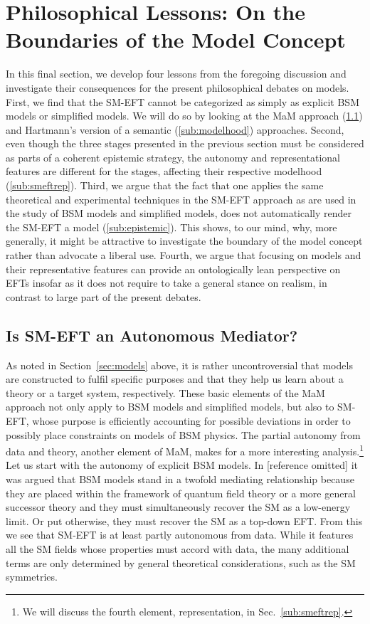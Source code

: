 \section{Philosophical Lessons: On the Boundaries of the Model Concept}	%
\label{sec:analysis}


In this final section, we develop four lessons from the foregoing discussion and investigate their consequences for the present philosophical debates on models. First, we find that the SM-EFT cannot be categorized as simply as explicit BSM models or simplified models. We will do so by looking at the MaM approach (\ref{sub:autonomy}) and Hartmann's version of a semantic (\ref{sub:modelhood}) approaches. Second, even though the three stages presented in the previous section must be considered as parts of a coherent epistemic strategy, the autonomy and representational features are different for the stages, affecting their respective modelhood (\ref{sub:smeftrep}).
Third, we argue that the fact that one applies the same theoretical and experimental techniques in the SM-EFT approach as are used in the study of BSM models and simplified models, does not automatically render the SM-EFT a model (\ref{sub:epistemic}). 
This shows, to our mind, why, more generally, it might be attractive to investigate the boundary of the model concept rather than advocate a liberal use. 
Fourth, we argue that focusing on models and their representative features can provide an ontologically lean perspective on EFTs insofar as it does not require to take a general stance on realism, in contrast to large part of the present debates.


\subsection{Is SM-EFT an Autonomous Mediator?} %
\label{sub:autonomy}

As noted in Section~\ref{sec:models} above, it is rather uncontroversial that models are constructed to fulfil specific purposes and that they help us learn about a theory or a target system, respectively.
These basic elements of the MaM approach not only apply to BSM models and simplified models, but also to SM-EFT, whose purpose is efficiently accounting for possible deviations in order to possibly place constraints on models of BSM physics. 
The partial autonomy from data and theory, another element of MaM, makes for a more interesting analysis.\footnote{We will discuss the fourth element, representation, in Sec.~\ref{sub:smeftrep}.}
Let us start with the autonomy of explicit BSM models.
In [reference omitted] it was argued that BSM models stand in a twofold mediating relationship because they are placed within the framework of quantum field theory or a more general successor theory and they must simultaneously recover the SM as a low-energy limit. 
Or put otherwise, they must recover the SM as a top-down EFT.
From this we see that SM-EFT is at least partly autonomous from data. While it features all the SM fields whose properties must accord with data, the many additional terms are only determined by general theoretical considerations, such as the SM symmetries.

